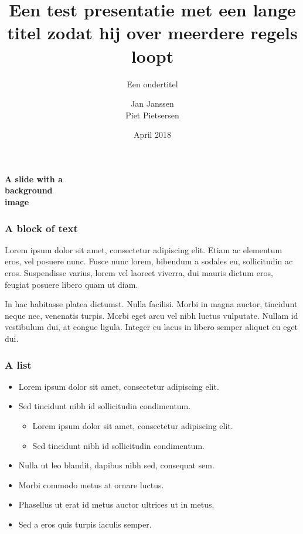 \documentclass[aspectratio=1610]{beamer}
\title{Een test presentatie met een lange titel zodat hij over meerdere regels loopt}
\subtitle{Een ondertitel}
\author{Jan Janssen\\Piet Pietsersen}
\date{April 2018}
\institute{}
\begin{document}
\begin{frame}[plain]
  \titlepage
\end{frame}

{ %
\begin{frame}
  \vspace*{-4cm}
  \Large\rm\bfseries A slide with a\\ background\\ image
\end{frame} }


{ %
\begin{frame}
  \titlepage
\end{frame} }

\begin{frame}
  \frametitle{A block of text}
  Lorem ipsum dolor sit amet, consectetur adipiscing elit. Etiam ac elementum
  eros, vel posuere nunc. Fusce nunc lorem, bibendum a sodales eu, sollicitudin
  ac eros. Suspendisse varius, lorem vel laoreet viverra, dui mauris dictum
  eros, feugiat posuere libero quam ut diam. 

  In hac habitasse platea dictumst.
  Nulla facilisi. Morbi in magna auctor, tincidunt neque nec, venenatis turpis.
  Morbi eget arcu vel nibh luctus vulputate. Nullam id vestibulum dui, at congue
  ligula. Integer eu lacus in libero semper aliquet eu eget dui.
\end{frame}

\begin{frame}
  \frametitle{A list}
  \begin{itemize}
    \item Lorem ipsum dolor sit amet, consectetur adipiscing elit.
    \item Sed tincidunt nibh id sollicitudin condimentum.
    \begin{itemize}
      \item Lorem ipsum dolor sit amet, consectetur adipiscing elit.
      \item Sed tincidunt nibh id sollicitudin condimentum.
    \end{itemize}
    \item Nulla ut leo blandit, dapibus nibh sed, consequat sem.
    \item Morbi commodo metus at ornare luctus.
    \item Phasellus ut erat id metus auctor ultrices ut in metus.
    \item Sed a eros quis turpis iaculis semper.
  \end{itemize}
\end{frame}
\end{document}
